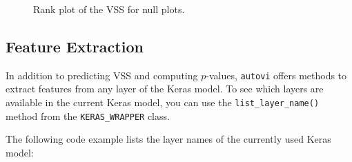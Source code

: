 \documentclass[
doublespace,
  times]{anzsauth}
\newenvironment{Shaded}{\begin{snugshade}}{\end{snugshade}}
\newcommand{\FunctionTok}[1]{\textcolor[rgb]{0.28,0.35,0.67}{#1}}
\newcommand{\NormalTok}[1]{\textcolor[rgb]{0.00,0.23,0.31}{#1}}
\newcommand{\OtherTok}[1]{\textcolor[rgb]{0.00,0.23,0.31}{#1}}
\newcommand{\SpecialCharTok}[1]{\textcolor[rgb]{0.37,0.37,0.37}{#1}}
\begin{document}
\begin{figure}[H]


\caption{\label{fig-autovi-rank-plot}Rank plot of the VSS for null
plots.}

\end{figure}%

\subsection{Feature Extraction}\label{feature-extraction}

In addition to predicting VSS and computing \(p\)-values,
\texttt{autovi} offers methods to extract features from any layer of the
Keras model. To see which layers are available in the current Keras
model, you can use the \texttt{list\_layer\_name()} method from the
\texttt{KERAS\_WRAPPER} class.

The following code example lists the layer names of the currently used
Keras model:

\begin{Shaded}
\end{Shaded}
\end{document}
